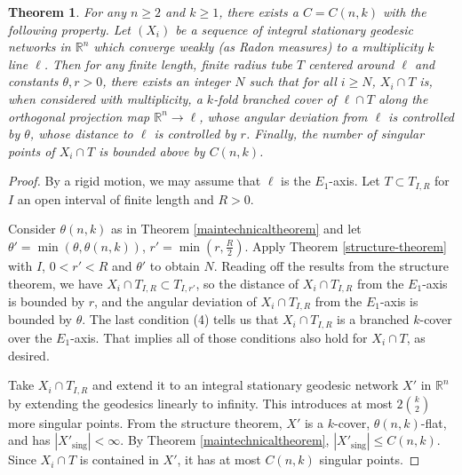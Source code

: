 \documentclass[11pt,reqno,twoside]{amsart}
\newcommand{\sing}{\mathrm{sing}}
\newtheorem{theorem}[lemma]{Theorem}
\theoremstyle{definition}
\begin{document}
    \begin{theorem}
        For any $n \geq 2$ and $k \geq 1$, there exists a $C = C(n,k)$ with the following property.
        Let $(X_i)$ be a sequence of integral stationary geodesic networks in $\mathbb{R}^n$ which converge weakly (as Radon measures) to a multiplicity $k$ line $\ell$. Then for any finite length, finite radius tube $T$ centered around $\ell$ and constants $\theta,r > 0$, there exists an integer $N$ such that for all $i \geq N$, $X_i \cap T$ is, when considered with multiplicity, a $k$-fold branched cover of $\ell \cap T$ along the orthogonal projection map $\mathbb{R}^n \to \ell$, whose angular deviation from $\ell$ is controlled by $\theta$, whose distance to $\ell$ is controlled by $r$. Finally, the number of singular points of $X_i \cap T$ is bounded above by $C(n,k)$. 
    \end{theorem}
    \begin{proof}
        By a rigid motion, we may assume that $\ell$ is the $E_1$-axis. Let $T \subset T_{I,R}$ for $I$ an open interval of finite length and $R > 0$.

        Consider $\theta(n,k)$ as in Theorem \ref{maintechnicaltheorem} and let $\theta' = \min(\theta,\theta(n,k))$, $r' = \min(r,\frac{R}{2}).$
        Apply Theorem \ref{structure-theorem} with $I$, $0 < r' < R$ and $\theta'$ to obtain $N$. Reading off the results from the structure theorem, we have $X_i \cap T_{I,R} \subset T_{I,r'}$, so the distance of $X_i \cap T_{I,R}$ from the $E_1$-axis is bounded by $r$, and the angular deviation of $X_i \cap T_{I,R}$ from the $E_1$-axis is bounded by $\theta$. The last condition (4) tells us that $X_i \cap T_{I,R}$ is a branched $k$-cover over the $E_1$-axis. That implies all of those conditions also hold for $X_i \cap T$, as desired.

        Take $X_i \cap T_{I,R}$ and extend it to an integral stationary geodesic network $X'$ in $\mathbb{R}^n$ by extending the geodesics linearly to infinity. This introduces at most $2{k \choose 2}$ more singular points. From the structure theorem, $X'$ is a $k$-cover, $\theta(n,k)$-flat, and has $|X'_\sing| < \infty$. By Theorem \ref{maintechnicaltheorem}, $|X'_\sing| \leq C(n,k)$. Since $X_i \cap T$ is contained in $X'$, it has at most $C(n,k)$ singular points.
    \end{proof}



\end{document}
